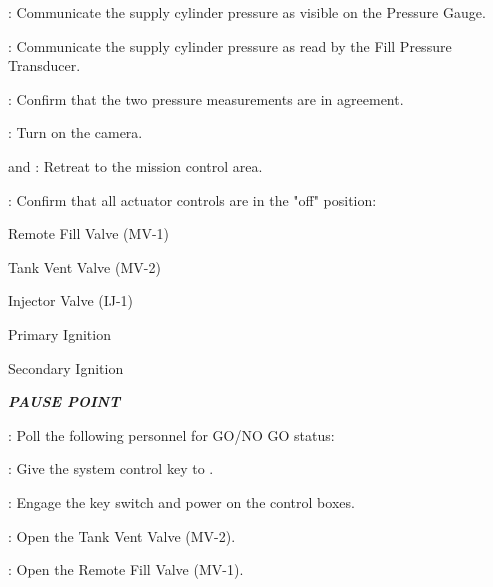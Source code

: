 \begin{checklist}
\begin{checklist}[label=$\bullet$]
\begin{checklist}
    		\end{checklist}
    	\end{checklist}
    	\item \primary{}: Communicate the supply cylinder pressure as visible on the Pressure Gauge. 
    	\item \daq{}: Communicate the supply cylinder pressure as read by the Fill Pressure Transducer. 
    	\item \daq{}: Confirm that the two pressure measurements are in agreement.
    	\item \primary{}: Turn on the camera.  
    	\item \primary{} and \secondary{}: Retreat to the mission control area. 
    	\item \control{}: Confirm that all actuator controls are in the "off" position:
    	\begin{checklist}
    		\item Remote Fill Valve (MV-1)
    		\item Tank Vent Valve (MV-2)
    		\item Injector Valve (IJ-1)
    		\item Primary Ignition
    		\item Secondary Ignition
    	\end{checklist}
    	\item \textbf{\textit{PAUSE POINT}}
    	\item \ops{}: Poll the following personnel for GO/NO GO status:
    	\begin{checklist}
    		\item \peri{}
    		\item \perii{}
    		\item \periii{}
    		\item \periv{}
    		\item \daq{}
    		\item \control{}
    		\item \primary{}
    		\item \secondary{}
    	\end{checklist}
    	\item \ops{}: Give the system control key to \control{}.
    	\item \control{}: Engage the key switch and power on the control boxes. 
    	\item \control{}: Open the Tank Vent Valve (MV-2).
    	\item \control{}: Open the Remote Fill Valve (MV-1).
    	\begin{checklist}[label=$\bullet$]

\end{checklist}
\end{checklist}
